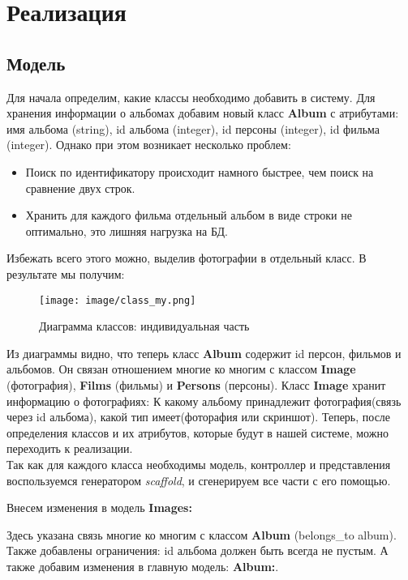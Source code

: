 ﻿\section{Реализация}
\subsection{Модель}
Для начала определим, какие классы необходимо добавить в систему.  Для хранения информации о альбомах добавим новый класс \textbf{Album}  с атрибутами: имя альбома (string), id альбома (integer), id персоны (integer), id фильма (integer). Однако при этом возникает несколько проблем:

\begin{itemize}
\item Поиск по идентификатору происходит намного быстрее, чем поиск на сравнение двух строк.
\item Хранить для каждого фильма отдельный альбом в виде строки не оптимально, это лишняя нагрузка на БД.
\end{itemize}

Избежать всего этого можно, выделив фотографии в отдельный класс. В результате мы получим:

\begin{figure}[h!]
\begin{center}
\texttt{[image: image/class\_my.png]}
\end{center}
\caption{Диаграмма классов: индивидуальная часть}
\end{figure}

Из диаграммы видно, что теперь класс \textbf{Album} содержит id персон, фильмов и альбомов. Он связан отношением многие ко многим с классом \textbf{Image} (фотография), \textbf{Films} (фильмы) и \textbf{Persons} (персоны). Класс \textbf{Image} хранит информацию о фотографиях: К какому альбому принадлежит фотография(связь через id альбома), какой тип имеет(фоторафия или скриншот). Теперь, после определения классов и их атрибутов, которые будут в нашей системе, можно переходить к реализации.\\
Так как для каждого класса необходимы модель, контроллер и представления воспользуемся генератором \textit{scaffold}, и сгенерируем все части с его помощью.

Внесем изменения в модель \textbf{Images:}

Здесь указана связь многие ко многим с классом \textbf{Album} (belongs\_to \:album). Также добавлены ограничения: id альбома должен быть всегда не пустым. 
А также добавим изменения в главную модель: \textbf{Album:}. 

